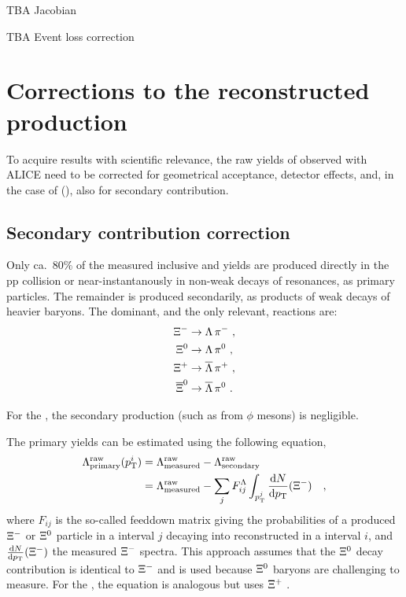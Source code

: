 TBA Jacobian

TBA Event loss correction

\section{Corrections to the reconstructed production}

To acquire results with scientific relevance, the raw yields of \VOs observed with ALICE need to be corrected for geometrical acceptance, detector effects, and, in the case of \LA(\AL), also for secondary contribution.

\subsection{Secondary contribution correction}

Only ca.\ $80\%$ of the measured inclusive \LA and \AL yields are produced directly in the pp collision or near-instantanously in non-weak decays of resonances, as primary particles. The remainder is produced secondarily, as products of weak decays of heavier baryons. The dominant, and the only relevant, reactions are:
\begin{align}
\Xi^- &\rightarrow \Lambda \, \pi^{-} \, \, , \\
\Xi^0 &\rightarrow \Lambda \, \pi^0 \, \, ,\\
\Xi^+ &\rightarrow \overline{\Lambda} \, \pi^{+} \, \, ,\\
\overline{\Xi}^0 &\rightarrow \overline{\Lambda} \, \pi^0 \, \, .
\end{align}

For the \KOs, the secondary production (such as from $\phi$ mesons) is negligible.

The primary \LA yields can be estimated using the following equation,
\begin{align}
\LA^\mathrm{raw}_\mathrm{primary} (\pt^i ) &= \LA^\mathrm{raw}_\mathrm{measured} - \LA^\mathrm{raw}_\mathrm{secondary}  \, \, \\
&= \LA^\mathrm{raw}_\mathrm{measured} - \sum_j F_{ij}^\LA \int_{\pt^j} \odv{N}{\pt} (\XI^-) \quad ,
\end{align}
where $F_{ij}$ is the so-called feeddown matrix giving the probabilities of a produced $\Xi^-$ or $\Xi^0$ particle in a \pt interval $j$ decaying into reconstructed \LA in a \pt interval $i$, and $\odv{N}{\pt} (\XI^-)$ the measured $\Xi^-$ spectra.  This approach assumes that the $\Xi^0$ decay contribution is identical to $\Xi^-$ and is used because $\Xi^0$ baryons are challenging to measure. For the \AL , the equation is analogous but uses $\Xi^+$ .

